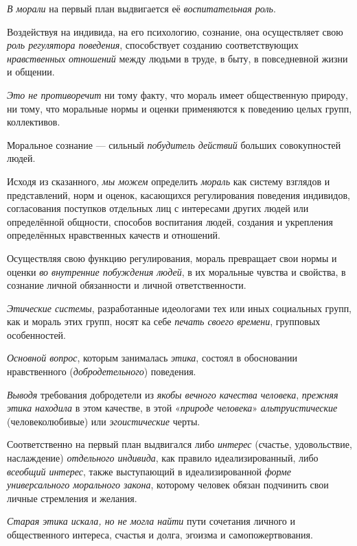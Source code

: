 \documentclass[a4paper,14pt,russian]{extreport}
\begin{document}
\emph{В морали} на первый план выдвигается её \emph{воспитательная роль}.

Воздействуя на индивида, на его психологию, сознание, она осуществляет свою \emph{роль регулятора поведения}, способствует созданию соответствующих \emph{нравственных отношений} между людьми в труде, в быту, в повседневной жизни и общении.

\emph{Это не противоречит} ни тому факту, что мораль имеет общественную природу, ни тому, что моральные нормы и оценки применяются к поведению целых групп, коллективов.

Моральное сознание --- сильный \emph{побудитель действий} больших совокупностей людей.

Исходя из сказанного, \emph{мы можем} определить \emph{мораль} как систему взглядов и представлений, норм и оценок, касающихся регулирования поведения индивидов, согласования поступков отдельных лиц с интересами других людей или определённой общности, способов воспитания людей, создания и укрепления определённых нравственных качеств и отношений.

Осуществляя свою функцию регулирования, мораль превращает свои нормы и оценки \emph{во внутренние побуждения людей}, в их моральные чувства и свойства, в сознание личной обязанности и личной ответственности.

\emph{Этические системы}, разработанные идеологами тех или иных социальных групп, как и мораль этих групп, носят ка себе \emph{печать своего времени}, групповых особенностей.

\emph{Основной вопрос}, которым занималась \emph{этика}, состоял в обосновании нравственного (\emph{добродетельного}) поведения.

\emph{Выводя} требования добродетели из \emph{якобы вечного качества человека}, \emph{прежняя этика} \emph{находила} в этом качестве, в этой «\emph{природе человека}» \emph{альтруистические} (человеколюбивые) или \emph{эгоистические} черты.

Соответственно на первый план выдвигался либо \emph{интерес} (счастье, удовольствие, наслаждение) \emph{отдельного индивида}, как правило идеализированный, либо \emph{всеобщий интерес}, также выступающий в идеализированной \emph{форме универсального морального закона}, которому человек обязан подчинить свои личные стремления и желания.

\emph{Старая этика искала, но не могла найти} пути сочетания личного и общественного интереса, счастья и долга, эгоизма и самопожертвования.
\end{document}
